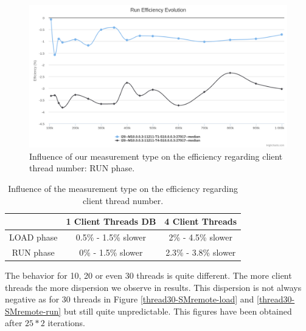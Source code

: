 \documentclass[a4paper,11pt]{report}
\begin{document}
\begin{figure}[ht]
\begin{center}
\includegraphics[width=1\linewidth]{images/evaluation/thread-SMremote-run.png}
\caption{Influence of our measurement type on the efficiency regarding client thread number: RUN phase.}
\label{thread-SMremote-run}
\end{center}
\end{figure}

\begin{table}[ht]
\begin{center}
	\begin{tabular}{|c|c|c|}
		\hline
		  & 1 Client Threads DB & 4 Client Threads \\
		\hline
	   	LOAD phase & 0.5\% - 1.5\% slower & 2\% - 4.5\% slower \\
	   	RUN phase & 0\% - 1.5\% slower & 2.3\% - 3.8\% slower \\
	    \hline
	\end{tabular}
	\caption{Influence of the measurement type on the efficiency regarding client thread number.}
\label{thread-table}
\end{center}
\end{table}

The behavior for 10, 20 or even 30 threads is quite different. The more client threads the more dispersion we observe in results. This dispersion is not always negative as for 30 threads in Figure \ref{thread30-SMremote-load} and \ref{thread30-SMremote-run} but still quite unpredictable. This figures have been obtained after $25*2$ iterations.
\end{document}
